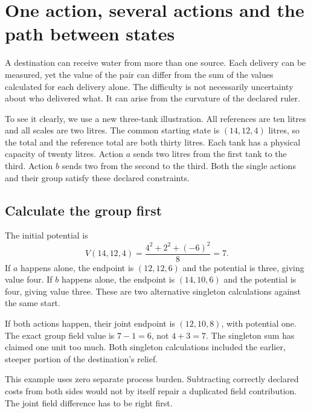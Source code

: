 \chapter{One action, several actions and the path between states}\label{ch:groups}

A destination can receive water from more than one source. Each delivery can be measured, yet the value of the pair can differ from the sum of the values calculated for each delivery alone. The difficulty is not necessarily uncertainty about who delivered what. It can arise from the curvature of the declared ruler.

To see it clearly, we use a new three-tank illustration. All references are ten litres and all scales are two litres. The common starting state is $(14,12,4)$ litres, so the total and the reference total are both thirty litres. Each tank has a physical capacity of twenty litres. Action $a$ sends two litres from the first tank to the third. Action $b$ sends two from the second to the third. Both the single actions and their group satisfy these declared constraints.

\section{Calculate the group first}
The initial potential is
\begin{equation*}
 V(14,12,4)=\frac{4^2+2^2+(-6)^2}{8}=7.
\end{equation*}
If $a$ happens alone, the endpoint is $(12,12,6)$ and the potential is three, giving value four. If $b$ happens alone, the endpoint is $(14,10,6)$ and the potential is four, giving value three. These are two alternative singleton calculations against the same start.

If both actions happen, their joint endpoint is $(12,10,8)$, with potential one. The exact group field value is $7-1=6$, not $4+3=7$. The singleton sum has claimed one unit too much. Both singleton calculations included the earlier, steeper portion of the destination's relief.


This example uses zero separate process burden. Subtracting correctly declared costs from both sides would not by itself repair a duplicated field contribution. The joint field difference has to be right first.

